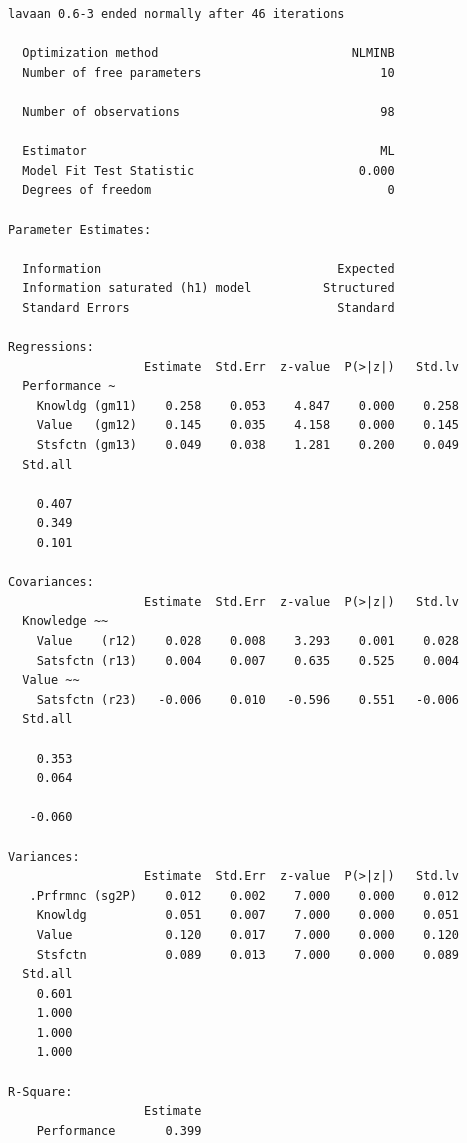 \begin{verbatim}
lavaan 0.6-3 ended normally after 46 iterations

  Optimization method                           NLMINB
  Number of free parameters                         10

  Number of observations                            98

  Estimator                                         ML
  Model Fit Test Statistic                       0.000
  Degrees of freedom                                 0

Parameter Estimates:

  Information                                 Expected
  Information saturated (h1) model          Structured
  Standard Errors                             Standard

Regressions:
                   Estimate  Std.Err  z-value  P(>|z|)   Std.lv
  Performance ~                                                
    Knowldg (gm11)    0.258    0.053    4.847    0.000    0.258
    Value   (gm12)    0.145    0.035    4.158    0.000    0.145
    Stsfctn (gm13)    0.049    0.038    1.281    0.200    0.049
  Std.all
         
    0.407
    0.349
    0.101

Covariances:
                   Estimate  Std.Err  z-value  P(>|z|)   Std.lv
  Knowledge ~~                                                 
    Value    (r12)    0.028    0.008    3.293    0.001    0.028
    Satsfctn (r13)    0.004    0.007    0.635    0.525    0.004
  Value ~~                                                     
    Satsfctn (r23)   -0.006    0.010   -0.596    0.551   -0.006
  Std.all
         
    0.353
    0.064
         
   -0.060

Variances:
                   Estimate  Std.Err  z-value  P(>|z|)   Std.lv
   .Prfrmnc (sg2P)    0.012    0.002    7.000    0.000    0.012
    Knowldg           0.051    0.007    7.000    0.000    0.051
    Value             0.120    0.017    7.000    0.000    0.120
    Stsfctn           0.089    0.013    7.000    0.000    0.089
  Std.all
    0.601
    1.000
    1.000
    1.000

R-Square:
                   Estimate
    Performance       0.399
\end{verbatim}

